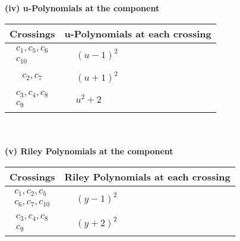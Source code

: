 \documentclass[1p]{elsarticle_modified}
\theoremstyle{definition}
\begin{document}
\newpage\renewcommand{\arraystretch}{1}
\flushleft \textbf{(iv) u-Polynomials at the component}\newline \\
\begin{tabular}{m{50pt}|m{274pt}}
Crossings & \hspace{64pt}u-Polynomials at each crossing \\
\hline $$\begin{aligned}c_{1},c_{5},c_{6}\\c_{10}\end{aligned}$$&$\begin{aligned}
&(u-1)^2
\end{aligned}$\\
\hline $$\begin{aligned}c_{2},c_{7}\end{aligned}$$&$\begin{aligned}
&(u+1)^2
\end{aligned}$\\
\hline $$\begin{aligned}c_{3},c_{4},c_{8}\\c_{9}\end{aligned}$$&$\begin{aligned}
&u^2+2
\end{aligned}$\\
\hline
\end{tabular}\\~\\
\newpage\renewcommand{\arraystretch}{1}
\flushleft \textbf{(v) Riley Polynomials at the component}\newline \\
\begin{tabular}{m{50pt}|m{274pt}}
Crossings & \hspace{64pt}Riley Polynomials at each crossing \\
\hline $$\begin{aligned}c_{1},c_{2},c_{5}\\c_{6},c_{7},c_{10}\end{aligned}$$&$\begin{aligned}
&(y-1)^2
\end{aligned}$\\
\hline $$\begin{aligned}c_{3},c_{4},c_{8}\\c_{9}\end{aligned}$$&$\begin{aligned}
&(y+2)^2
\end{aligned}$\\
\hline
\end{tabular}\\~\\
\end{document}
